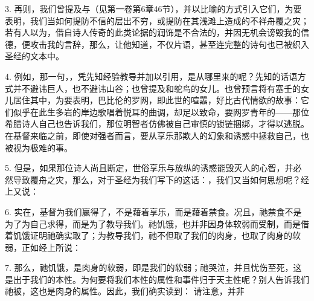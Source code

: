 3. 再则，我们曾提及与（见第一卷第6章46节），并以比喻的方式引入它们，为要表明，我们当如何提防不信的层出不穷，或提防在其浅滩上造成的不祥舟覆之灾；若有人以为，借自诗人传奇的此类论据的润饰是不合法的，并因无机会谤毁我的信德，便攻击我的言辞，那么，让他知道，不仅片语，甚至连完整的诗句也已被织入圣经的文本中。\par

4. 例如，那一句，，凭先知经验教导并加以引用，是从哪里来的呢？先知的话语方式并不避讳巨人，也不避讳山谷；也曾提及和鸵鸟的女儿。也曾预言将有塞壬的女儿居住其中，为要表明，巴比伦的罗网，即此世的喧嚣，好比古代情欲的故事：它们似乎在此生多岩的岸边歌唱着悦耳的曲调，却足以致命，要网罗青年的——那位希腊诗人自己也告诉我们，那位明智者仿佛被自己审慎的锁链捆绑，才得以逃脱。在基督来临之前，即使对强者而言，要从享乐那欺人的幻象和诱惑中拯救自己，也被视为极难的事。\par

5. 但是，如果那位诗人尚且断定，世俗享乐与放纵的诱惑能毁灭人的心智，并必然导致覆舟之灾，那么，对于圣经为我们写下的这话：，我们又当如何思想呢？经上又说：\par

6. 实在，基督为我们赢得了，不是藉着享乐，而是藉着禁食。况且，祂禁食不是为了为自己求得，而是为了教导我们。祂饥饿，也并非因身体软弱而受制，而是借着饥饿证明祂确实取了；为教导我们，祂不但取了我们的肉身，也取了肉身的软弱，正如经上所说：\par

\par

7. 那么，祂饥饿，是肉身的软弱，即是我们的软弱；祂哭泣，并且忧伤至死，这是出于我们的本性。为何要将我们本性的属性和事件归于天主性呢？别人告诉我们祂被，这也是肉身的属性。因此，我们确实读到： 请注意，并非\par

